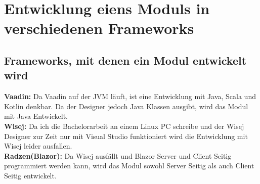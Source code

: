 \documentclass[ngerman]{article}
\begin{document}
    \section{Entwicklung eiens Moduls in verschiedenen Frameworks}
    \label{Neuentwicklung}
    \subsection{Frameworks, mit denen ein Modul entwickelt wird}
    \textbf{Vaadin:} Da Vaadin auf der JVM läuft, ist eine Entwicklung mit Java, Scala und Kotlin denkbar. Da der Designer jedoch Java Klassen ausgibt, wird das Modul mit Java Entwickelt.\\
    \textbf{Wisej:} Da ich die Bachelorarbeit an einem Linux PC schreibe und der Wisej Designer zur Zeit nur mit Visual Studio funktioniert wird die Entwicklung mit Wisej leider ausfallen.\\
    \textbf{Radzen(Blazor):} Da Wisej ausfällt und Blazor Server und Client Seitig programmiert werden kann, wird das Modul sowohl Server Seitig als auch Client Seitig entwickelt.
\end{document}
